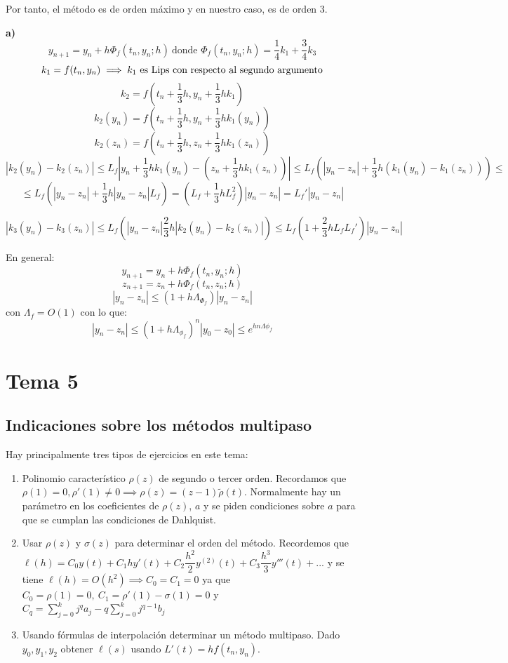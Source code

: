 \documentclass[openany]{book}
\begin{document}
\begin{exercise}
        Por tanto, el método es de orden máximo y en nuestro caso, es de orden 3.

        \textbf{a)}
        $$ y_{n+1} = y_n+h \Phi_{f}(t_n,y_n;h)\ \text{donde } \Phi_{f}(t_n,y_n;h) = \dfrac{1}{4}k_1+\dfrac{3}{4}k_3 $$
        $$ k_1 = f(t_n,y_n) \implies \text{$ k_1 $ es Lips con respecto al segundo argumento} $$
        $$ k_2 = f(t_n+\dfrac{1}{3}h,y_n+\dfrac{1}{3}hk_1) $$
        $$ k_2(y_n) = f(t_n+\dfrac{1}{3}h,y_n+\dfrac{1}{3}hk_1(y_n)) $$
        $$ k_2(z_n) = f(t_n+\dfrac{1}{3}h,z_n+\dfrac{1}{3}hk_1(z_n)) $$
        $$ |k_2(y_n)- k_2(z_n) | \leq L_{f}|y_n+\dfrac{1}{3}hk_1(y_n) - (z_n+\dfrac{1}{3}hk_1(z_n))| \leq L_{f}(|y_n-z_n|+\dfrac{1}{3}h(k_1(y_n)-k_1(z_n)))\leq$$
        $$ \leq L_{f}(|y_n-z_n| + \dfrac{1}{3}h |y_n-z_n|L_{f}) = (L_{f}+\dfrac{1}{3}hL_{f}^2) |y_n-z_n| = L_{f}' |y_n-z_n| $$

        $$ |k_3(y_n) - k_3(z_n)| \leq L_{f}(|y_n-z_n|  \dfrac{2}{3}h|k_2(y_n)-k_2(z_n)|) \leq L_{f}(1+\dfrac{2}{3}hL_{f}L_{f}') |y_n-z_n| $$

        En general:
        $$ y_{n+1} = y_n + h \Phi_{f}(t_n,y_n;h) $$
        $$ z_{n+1} = z_n + h \Phi_{f}(t_n,z_n;h) $$
        $$ |y_n-z_n| \leq (1+h \Lambda _{\Phi_{f}}) |y_n-z_n| $$
        con $ \Lambda_{f} = O(1) $ con lo que:
        $$ |y_n-z_n| \leq (1+h \Lambda _{\phi_{f}})^{n} |y_0-z_0| \leq e^{hn \Lambda \phi_{f}} $$


    \end{exercise}


    \chapter{Tema 5}

    \section{Indicaciones sobre los métodos multipaso}

    Hay principalmente tres tipos de ejercicios en este tema:

    \begin{enumerate}
        \item Polinomio característico $ \rho(z) $ de segundo o tercer orden. Recordamos que $ \rho (1) = 0, \rho'(1) \ne 0 \implies \rho (z)= (z-1) \widetilde{\rho}(t)$. Normalmente hay un parámetro en los coeficientes de $ \rho(z) $, $ a $ y se piden condiciones sobre $ a $ para que se cumplan las condiciones de Dahlquist.
        \item Usar $ \rho(z) $ y $ \sigma (z) $ para determinar el orden del método. Recordemos que $ \ell(h) = C_0y(t) + C_1hy'(t) + C_2\dfrac{h^2}{2}y ^{(2)}(t) + C_3\dfrac{h^3}{3}y'''(t)+... $ y se tiene $ \ell(h) = O(h^2) \implies C_0 = C_1 = 0 $ ya que $ C_0 = \rho (1) = 0,\ C_1 = \rho'(1)-\sigma (1) = 0$ y $ C_{q} = \sum\limits_{j=0}^{k}j^{q}a_j - q \sum\limits_{j=0}^{k}j^{q-1}b_j $
        \item Usando fórmulas de interpolación determinar un método multipaso. Dado $ y_0,y_1,y_2 $ obtener $ \ell(s) $ usando $ L'(t)= hf(t_n,y_n) $.
    \end{enumerate}
\end{document}
